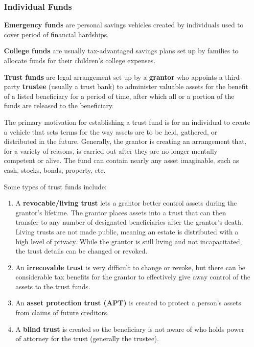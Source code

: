 \documentclass{article}
\begin{document}
    \subsubsection{Individual Funds}

      \begin{definition}
        \label{def:emergency-funds}
        \textbf{Emergency funds} are personal savings vehicles created by individuals used to cover period of financial hardships. 
      \end{definition}

      \begin{definition}
        \label{def:college-funds}
        \textbf{College funds} are usually tax-advantaged savings plans set up by families to allocate funds for their children's college expenses. 
      \end{definition}

      \begin{definition}
        \label{def:trust-funds}
        \textbf{Trust funds} are legal arrangement set up by a \textbf{grantor} who appoints a third-party \textbf{trustee} (usually a trust bank) to administer valuable assets for the benefit of a listed beneficiary for a period of time, after which all or a portion of the funds are released to the beneficiary. 

        The primary motivation for establishing a trust fund is for an individual to create a vehicle that sets terms for the way assets are to be held, gathered, or distributed in the future. Generally, the grantor is creating an arrangement that, for a variety of reasons, is carried out after they are no longer mentally competent or alive. The fund can contain nearly any asset imaginable, such as cash, stocks, bonds, property, etc. 

        Some types of trust funds include: 
        \begin{enumerate}
          \item A \textbf{revocable/living trust} lets a grantor better control assets during the grantor's lifetime. The grantor places assets into a trust that can then transfer to any number of designated beneficiaries after the grantor's death. Living trusts are not made public, meaning an estate is distributed with a high level of privacy. While the grantor is still living and not incapacitated, the trust details can be changed or revoked. 
          \item An \textbf{irrecovable trust} is very difficult to change or revoke, but there can be considerable tax benefits for the grantor to effectively give away control of the assets to the trust funds. 
          \item An \textbf{asset protection trust (APT)} is created to protect a person's assets from claims of future creditors. 
          \item A \textbf{blind trust} is created so the beneficiary is not aware of who holds power of attorney for the trust (generally the trustee). 
        \end{enumerate}
      \end{definition}
\end{document}
